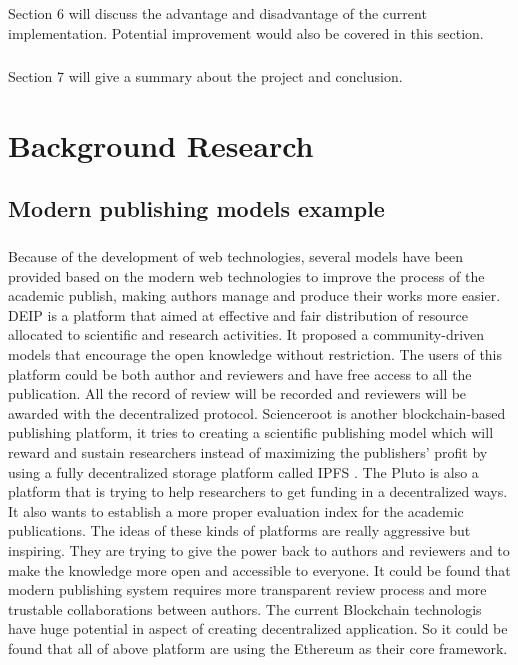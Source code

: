 \documentclass [12pt]{report}
\begin{document}
\paragraph{}Section 6 will discuss the advantage and disadvantage of the current implementation.
Potential improvement would also be covered in this section.
\paragraph{}Section 7 will give a summary about the project and conclusion.
\chapter{Background Research}
\section{Modern publishing models example}
\paragraph{}Because of the development of web technologies, 
several models have been provided based on the modern web technologies to improve the process of the academic publish, 
making authors manage and produce their works more easier. 
DEIP \cite{DEIP} is a platform that aimed at effective and 
fair distribution of resource allocated to scientific and research activities.
It proposed a community-driven models that encourage the open knowledge without restriction.
The users of this platform could be both author and reviewers and have free access to all the publication. 
All the record of review will be recorded and reviewers will be awarded with the decentralized protocol.
Scienceroot \cite{science} is another blockchain-based publishing platform, 
it tries to creating a scientific publishing model which will reward and sustain researchers instead of maximizing the publishers' profit 
by using a fully decentralized storage platform called IPFS \cite{benet2014ipfs}. 
The Pluto \cite{Pluto} is also a platform that is trying to help researchers to get funding in a decentralized ways. 
It also wants to establish a more proper evaluation index for the academic publications. 
The ideas of these kinds of platforms are really aggressive but inspiring. 
They are trying to give the power back to authors and reviewers and to make the knowledge more open and accessible to everyone.
It could be found that modern publishing system requires more transparent review process and more trustable collaborations between authors.
The current Blockchain technologis have huge potential in aspect of creating decentralized application. So it could be found that all of above platform are 
using the Ethereum \cite{buterin2013ethereum} as their core framework. 
\end{document}

